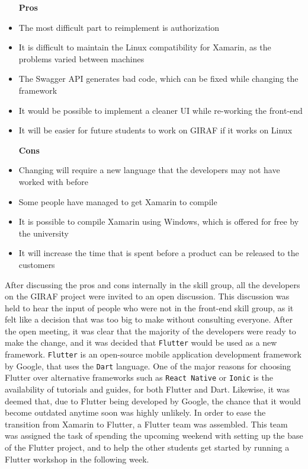 \begin{itemize}
    \item [\textbf{Pros}]
    \item The most difficult part to reimplement is authorization
    \item It is difficult to maintain the Linux compatibility for Xamarin, as the problems varied between machines
    \item The Swagger API generates bad code, which can be fixed while changing the framework
    \item It would be possible to implement a cleaner UI while re-working the front-end
    \item It will be easier for future students to work on GIRAF if it works on Linux
    \item [\textbf{Cons}]
    \item Changing will require a new language that the developers may not have worked with before
    \item Some people have managed to get Xamarin to compile
    \item It is possible to compile Xamarin using Windows, which is offered for free by the university
    \item It will increase the time that is spent before a product can be released to the customers
\end{itemize}
\noindent
After discussing the pros and cons internally in the skill group, all the developers on the GIRAF project were invited to an open discussion. 
This discussion was held to hear the input of people who were not in the front-end skill group, as it felt like a decision that was too big to make without consulting everyone.
After the open meeting, it was clear that the majority of the developers were ready to make the change, and it was decided that \texttt{Flutter} would be used as a new framework. 
\texttt{Flutter} is an open-source mobile application development framework by Google, that uses the \texttt{Dart} language.
One of the major reasons for choosing Flutter over alternative frameworks such as \texttt{React Native} or \texttt{Ionic} is the availability of tutorials and guides, for both Flutter and Dart. 
Likewise, it was deemed that, due to Flutter being developed by Google, the chance that it would become outdated anytime soon was highly unlikely.
In order to ease the transition from Xamarin to Flutter, a Flutter team was assembled.
This team was assigned the task of spending the upcoming weekend with setting up the base of the Flutter project, and to help the other students get started by running a Flutter workshop in the following week.

